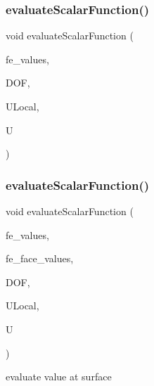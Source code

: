 \subsubsection{\texorpdfstring{evaluateScalarFunction()}{evaluateScalarFunction()}\hspace{0.1cm}{\footnotesize\ttfamily [1/2]}}
{\footnotesize\ttfamily void evaluate\+Scalar\+Function (\begin{DoxyParamCaption}\item[{const F\+E\+Values$<$ dim $>$ \&}]{fe\+\_\+values,  }\item[{unsigned int}]{D\+OF,  }\item[{Table$<$ 1, T $>$ \&}]{U\+Local,  }\item[{Table$<$ 1, T $>$ \&}]{U }\end{DoxyParamCaption})}

\mbox{\label{group___evaluation_functions_ga2e2fbeb2173113c6889c73bbb7304789}} 
\subsubsection{\texorpdfstring{evaluateScalarFunction()}{evaluateScalarFunction()}\hspace{0.1cm}{\footnotesize\ttfamily [2/2]}}
{\footnotesize\ttfamily void evaluate\+Scalar\+Function (\begin{DoxyParamCaption}\item[{const F\+E\+Values$<$ dim $>$ \&}]{fe\+\_\+values,  }\item[{const F\+E\+Face\+Values$<$ dim $>$ \&}]{fe\+\_\+face\+\_\+values,  }\item[{unsigned int}]{D\+OF,  }\item[{Table$<$ 1, T $>$ \&}]{U\+Local,  }\item[{Table$<$ 1, T $>$ \&}]{U }\end{DoxyParamCaption})}

evaluate value at surface \mbox{\label{group___evaluation_functions_ga3ee6127c2c5c8333bb7fb384dcdb431f}} 
